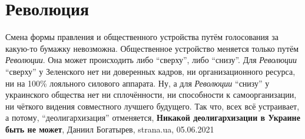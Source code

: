  
 
 
 
 
\chapter{Революция}

Смена формы правления и общественного устройства путём голосования за какую-то
бумажку невозможна. Общественное устройство меняется только путём
\emph{Революции}. Она может происходить либо \enquote{сверху}, либо
\enquote{снизу}. Для \emph{Революции} \enquote{сверху} у Зеленского нет ни
доверенных кадров, ни организационного ресурса, ни на 100\% лояльного силового
аппарата. Ну, а для \emph{Революции} \enquote{снизу} у украинского общества нет
ни сплочённости, ни способности к самоорганизации, ни чёткого видения
совместного лучшего будущего. Так что, всех всё устраивает, а потому,
\enquote{деолигархизация} отменяется,
\textbf{Никакой деолигархизации в Украине быть не может},
Даниил Богатырев, strana.ua, 05.06.2021
